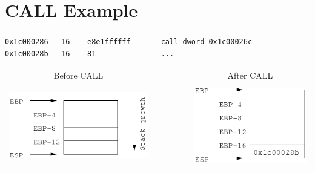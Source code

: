 \documentclass{beamer}
\begin{document}
\section{CALL Example}
\begin{frame}[fragile]
  \frametitle{\insertsection}

\begin{lstlisting}[basicstyle=\footnotesize\tt]
0x1c000286   16    e8e1ffffff       call dword 0x1c00026c
0x1c00028b   16    81               ...
\end{lstlisting}

\vfill

\begin{tabular}{ccc}
Before CALL&&After CALL\\
\\
\includegraphics[width=.44\textwidth]{stack1.pdf}&
~~~~~~~&
\includegraphics[width=.37\textwidth]{stack2.pdf}\\
\end{tabular}
\end{frame}
\end{document}
